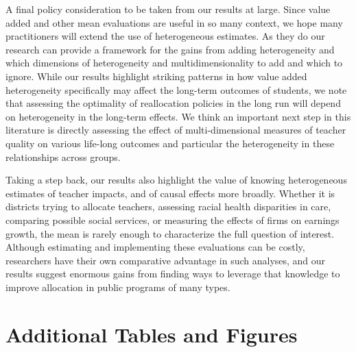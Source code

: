 \documentclass[12pt]{article}
\theoremstyle{definition}
\theoremstyle{definition}
\theoremstyle{definition}
\theoremstyle{definition}
\begin{document}
A final policy consideration to be taken from our results at large. Since value added and other mean evaluations are useful in so many context, we hope many practitioners will extend the use of heterogeneous estimates. As they do our research can provide a framework for the gains from adding heterogeneity and which dimensions of heterogeneity and multidimensionality to add and which to ignore. While our results highlight striking patterns in how value added heterogeneity specifically may affect the long-term outcomes of students, we note that assessing the optimality of reallocation policies in the long run will depend on heterogeneity in the long-term effects. We think an important next step in this literature is directly assessing the effect of multi-dimensional measures of teacher quality on various life-long outcomes and particular the heterogeneity in these relationships across groups. 

Taking a step back, our results also highlight the value of knowing heterogeneous estimates of teacher impacts, and of causal effects more broadly. Whether it is districts trying to allocate teachers, assessing racial health disparities in care, comparing possible social services, or measuring the effects of firms on earnings growth, the mean is rarely enough to characterize the full question of interest. Although estimating and implementing these evaluations can be costly, researchers have their own comparative advantage in such analyses, and our results suggest enormous gains from finding ways to leverage that knowledge to improve allocation in public programs of many types.





\renewcommand\thefigure{\thesection.\arabic{figure}}  
\renewcommand\thetable{\thesection.\arabic{table}}  
\setcounter{figure}{0}  
\setcounter{table}{0}  


\appendix



\section{Additional Tables and Figures}
\end{document}
